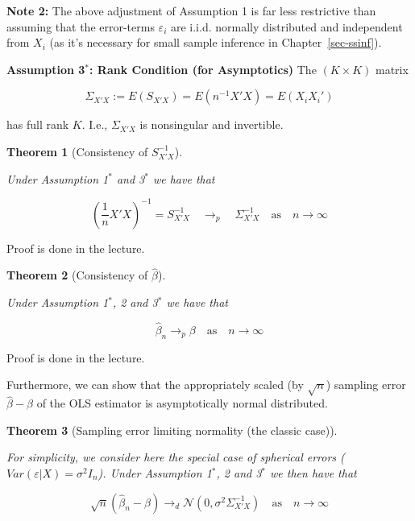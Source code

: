 \documentclass[
  letterpaper,
  DIV=11,
  numbers=noendperiod]{scrreprt}
\theoremstyle{definition}
\theoremstyle{plain}
\newtheorem{theorem}{Theorem}[chapter]
\theoremstyle{plain}
\theoremstyle{remark}
\begin{document}
{\textbf{Note 2:} The above adjustment of Assumption 1 is far less
restrictive than assuming that the error-terms \(\varepsilon_i\) are
i.i.d. normally distributed and independent from \(X_i\) (as it's
necessary for small sample inference in Chapter~\ref{sec-ssinf}).

\textbf{Assumption 3\(^\ast\): Rank Condition (for Asymptotics)} The
\((K\times K)\) matrix

\[\Sigma_{X'X}:=E(S_{X'X})=E(n^{-1}X'X)=E(X_iX_i')\]

has full rank \(K\). I.e., \(\Sigma_{X'X}\) is nonsingular and
invertible.

\leavevmode{}%
\begin{theorem}[Consistency of \(S_{X'X}^{-1}\)]\label{thm-Sxx1}

Under Assumption 1\(^\ast\) and 3\(^\ast\) we have that

\[\left(\frac{1}{n}X'X\right)^{-1}=S_{X'X}^{-1}\quad\to_{p}\quad\Sigma_{X'X}^{-1}\quad\text{as}\quad n\to\infty\]

\end{theorem}

Proof is done in the lecture.

\leavevmode{}%
\begin{theorem}[Consistency of \(\hat\beta\)]\label{thm-bconsistent1}

Under Assumption 1\(^\ast\), 2 and 3\(^\ast\) we have that

\[\hat\beta_n\to_{p}\beta\quad\text{as}\quad n\to\infty\]

\end{theorem}

Proof is done in the lecture.

Furthermore, we can show that the appropriately scaled (by \(\sqrt{n}\))
sampling error \(\hat\beta-\beta\) of the OLS estimator is
asymptotically normal distributed.

\leavevmode{}%
\begin{theorem}[Sampling error limiting normality (the classic
case)]\label{thm-OLSnormality1}

For simplicity, we consider here the special case of spherical errors
(\(Var(\varepsilon|X)=\sigma^2I_n\)). Under Assumption 1\(^\ast\), 2 and
3\(^\ast\) we then have that

\[\sqrt{n}(\hat\beta_n-\beta)\to_{d} \mathcal{N}\left(0,\sigma^2 \Sigma^{-1}_{X'X}\right)\quad\text{as}\quad n\to\infty\]


\end{theorem}}
\end{document}
